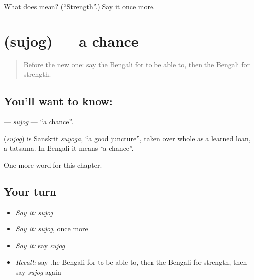 \begin{tcolorbox}[breakable,colback=teal!4,colframe=teal!35!black,title={Before you move on}]
What does  mean? (\textquotedblleft{}Strength\textquotedblright{}.) Say it once more.
\end{tcolorbox}
\section[\texorpdfstring{\bn{সুযোগ} (sujog)}{সুযোগ (sujog)}]{ (sujog) — a chance}

\label{lesson:BN-C98-sujog}



\begin{quote}
Before the new one: say the Bengali for to be able to, then the Bengali for strength.
\end{quote}

\subsection*{You'll want to know: }
\textbf{} — \emph{sujog} — \textquotedblleft{}a chance\textquotedblright{}.

\begin{cousinweb}
\textbf{} (\emph{sujog}) is Sanskrit \emph{suyoga}, \textquotedblleft{}a good juncture\textquotedblright{}, taken over whole as a learned loan, a tatsama. In Bengali it means \textquotedblleft{}a chance\textquotedblright{}.
\end{cousinweb}

\begin{grammarlens}[title={What you've built}]
One more word for this chapter.
\end{grammarlens}

\subsection*{Your turn}
\begin{itemize}
\raggedright
  \item \emph{Say it:} \emph{sujog}
  \item \emph{Say it:} \emph{sujog}, once more
  \item \emph{Say it:} say \emph{sujog}
  \item \emph{Recall:} say the Bengali for to be able to, then the Bengali for strength, then say \emph{sujog} again
\end{itemize}

